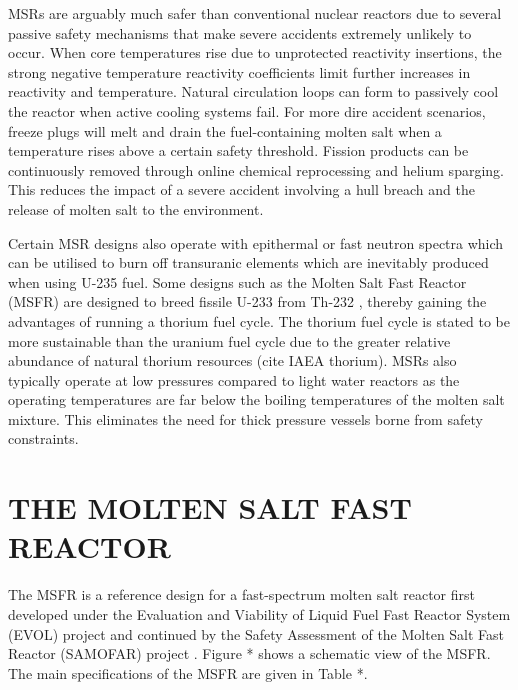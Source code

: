 \documentclass[letterpaper]{mandc2019}
\begin{document}
MSRs are arguably much safer than conventional nuclear reactors due to several passive safety mechanisms that make severe accidents extremely unlikely to occur. When core temperatures rise due to unprotected reactivity insertions, the strong negative temperature reactivity coefficients limit further increases in reactivity and temperature. Natural circulation loops can form to passively cool the reactor when active cooling systems fail. For more dire accident scenarios, freeze plugs will melt and drain the fuel-containing molten salt when a temperature rises above a certain safety threshold. Fission products can be continuously removed through online chemical reprocessing and helium sparging. This reduces the impact of a severe accident involving a hull breach and the release of molten salt to the environment.

Certain MSR designs also operate with epithermal or fast neutron spectra which can be utilised to burn off transuranic elements which are inevitably produced when using U-235 fuel. Some designs such as the Molten Salt Fast Reactor (MSFR) are designed to breed fissile U-233 from Th-232 \cite{serp_molten_2014}, thereby gaining the advantages of running a thorium fuel cycle. The thorium fuel cycle is stated to be more sustainable than the uranium fuel cycle due to the greater relative abundance of natural thorium resources (cite IAEA thorium). MSRs also typically operate at low pressures compared to light water reactors as the operating temperatures are far below the boiling temperatures of the molten salt mixture. This eliminates the need for thick pressure vessels borne from safety constraints.

\section{THE MOLTEN SALT FAST REACTOR}

The MSFR is a reference design for a fast-spectrum molten salt reactor first developed under the Evaluation and Viability of Liquid Fuel Fast Reactor System (EVOL) project and continued by the Safety Assessment of the Molten Salt Fast Reactor (SAMOFAR) project \cite{serp_molten_2014}. Figure * shows a schematic view of the MSFR. The main specifications of the MSFR are given in Table *.
\end{document}
